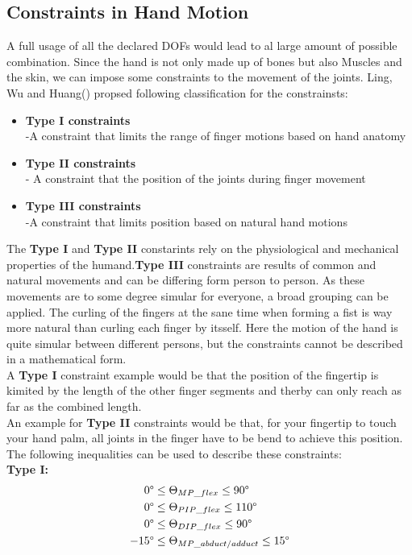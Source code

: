 \subsection{Constraints in Hand Motion}
A full usage of all the declared DOFs would lead to al large amount of possible combination. Since the hand is not only made up of bones but also Muscles and the skin, we can impose some constraints \cite{Badler.1987,Pavlovic.1997} to the movement of the joints. Ling, Wu and Huang(\cite{LIN.2000}) propsed following classification for the constrainsts:
\newpage
\begin{itemize}
\item \textbf{Type I constraints}\\
	-A constraint that limits the range of finger motions based on hand anatomy
	\item \textbf{Type II constraints}\\
	- A constraint that the position of the joints during finger movement
	\item \textbf{Type III constraints\\}
	-A constraint that limits position based on natural hand motions
\end{itemize} 
The \textbf{Type I} and \textbf{Type II} constarints rely on the physiological and mechanical properties of the humand.\textbf{Type III} constraints are results of common and natural
movements and can be differing form person to person. As these movements are to some degree simular for everyone, a broad grouping can be applied. The curling of the fingers at the sane time when forming a fist is way more natural than curling each finger by itsself. Here the motion of the hand is quite simular between different persons, but the constraints cannot be described in a mathematical form. \\
 A \textbf{Type I} constraint example would be that the position of the fingertip is kimited by the length of the other finger segments and therby can only reach as far as the combined length.\\An example for \textbf{Type II} constraints would be that, for your fingertip to touch your hand palm, all joints in the finger have to be bend to achieve this position.
The following inequalities can be used to describe these constraints:\\
\textbf{Type I:}
\begin{equation}
\begin{split}
0\degree&\leq \Theta _{MP\_flex} \leq 90\degree\\
0\degree&\leq \Theta _{PIP\_flex} \leq 110\degree\\
0\degree&\leq \Theta _{DIP\_flex} \leq 90\degree\\
-15\degree&\leq \Theta _{MP\_abduct/adduct} \leq 15\degree
\end{split}
\end{equation}
